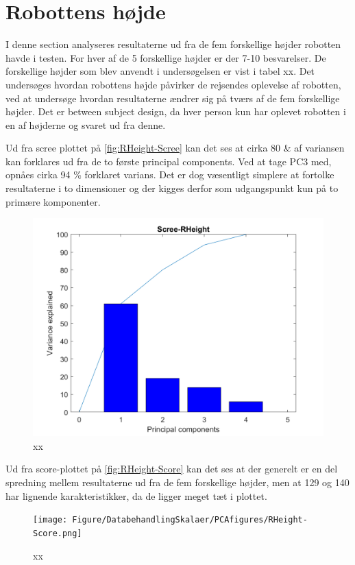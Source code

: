 \section{Robottens højde}
\label{sec:RHeight}
%
I denne section analyseres resultaterne ud fra de fem forskellige højder robotten havde i testen. For hver af de 5 forskellige højder er der 7-10 besvarelser. De forskellige højder som blev anvendt i undersøgelsen er vist i tabel xx. Det undersøges hvordan robottens højde påvirker de rejsendes oplevelse af robotten, ved at undersøge hvordan resultaterne ændrer sig på tværs af de fem forskellige højder. Det er between subject design, da hver person kun har oplevet robotten i en af højderne og svaret ud fra denne. 

Ud fra scree plottet på \autoref{fig:RHeight-Scree} kan det ses at cirka 80 \& af variansen kan forklares ud fra de to første principal components. Ved at tage PC3 med, opnåes cirka 94 \% forklaret varians. Det er dog væsentligt simplere at fortolke resultaterne i to dimensioner og der kigges derfor som udgangspunkt kun på to primære komponenter.

\begin{figure}[H]
\centering
\includegraphics[width=\textwidth]{Figure/DatabehandlingSkalaer/PCAfigures/RHeight-Scree.png}
\caption{xx}
\label{fig:RHeight-Scree}
\end{figure}

Ud fra score-plottet på \autoref{fig:RHeight-Score} kan det ses at der generelt er en del spredning mellem resultaterne ud fra de fem forskellige højder, men at 129 og 140 har lignende karakteristikker, da de ligger meget tæt i plottet.
\begin{figure}[H]
\centering
\texttt{[image: Figure/DatabehandlingSkalaer/PCAfigures/RHeight-Score.png]}
\caption{xx}
\label{fig:RHeight-Score}
\end{figure}

